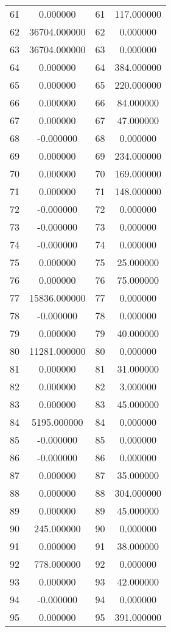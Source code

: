 \documentclass[12pt]{article}
\begin{document}
\begin{longtable}{@{}cccc@{}}
61 & 0.000000 & 61 & 117.000000 \\
62 & 36704.000000 & 62 & 0.000000 \\
63 & 36704.000000 & 63 & 0.000000 \\
64 & 0.000000 & 64 & 384.000000 \\
65 & 0.000000 & 65 & 220.000000 \\
66 & 0.000000 & 66 & 84.000000 \\
67 & 0.000000 & 67 & 47.000000 \\
68 & -0.000000 & 68 & 0.000000 \\
69 & 0.000000 & 69 & 234.000000 \\
70 & 0.000000 & 70 & 169.000000 \\
71 & 0.000000 & 71 & 148.000000 \\
72 & -0.000000 & 72 & 0.000000 \\
73 & -0.000000 & 73 & 0.000000 \\
74 & -0.000000 & 74 & 0.000000 \\
75 & 0.000000 & 75 & 25.000000 \\
76 & 0.000000 & 76 & 75.000000 \\
77 & 15836.000000 & 77 & 0.000000 \\
78 & -0.000000 & 78 & 0.000000 \\
79 & 0.000000 & 79 & 40.000000 \\
80 & 11281.000000 & 80 & 0.000000 \\
81 & 0.000000 & 81 & 31.000000 \\
82 & 0.000000 & 82 & 3.000000 \\
83 & 0.000000 & 83 & 45.000000 \\
84 & 5195.000000 & 84 & 0.000000 \\
85 & -0.000000 & 85 & 0.000000 \\
86 & -0.000000 & 86 & 0.000000 \\
87 & 0.000000 & 87 & 35.000000 \\
88 & 0.000000 & 88 & 304.000000 \\
89 & 0.000000 & 89 & 45.000000 \\
90 & 245.000000 & 90 & 0.000000 \\
91 & 0.000000 & 91 & 38.000000 \\
92 & 778.000000 & 92 & 0.000000 \\
93 & 0.000000 & 93 & 42.000000 \\
94 & -0.000000 & 94 & 0.000000 \\
95 & 0.000000 & 95 & 391.000000 \\

\end{longtable}
\end{document}
